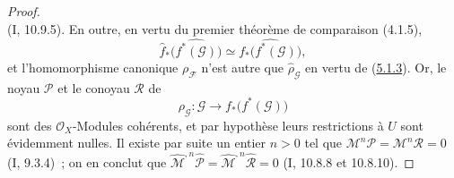 \begin{proof}
\[\]
(I, 10.9.5). En outre, en vertu du premier théorème de comparaison (4.1.5),
\[
\widehat f_*\bigl(\widehat{f^*(\mathcal G)}\bigr)
\simeq\widehat{f_*\bigl(f^*(\mathcal G)\bigr)},
\]
et l'homomorphisme canonique $\rho_{\mathcal F}$ n'est autre que
$\widehat{\rho}_{\mathcal G}$ en vertu de
(\hyperref[III.5.1.3-fr]{5.1.3}). Or, le noyau $\mathcal P$ et le conoyau
$\mathcal R$ de
\[
\rho_{\mathcal G}:\mathcal G\longrightarrow f_*\bigl(f^*(\mathcal G)\bigr)
\]
sont des $\mathcal O_X$-Modules cohérents, et par hypothèse leurs restrictions à
$U$ sont évidemment nulles. Il existe par suite un entier $n>0$ tel que
$\mathcal M^n\mathcal P=\mathcal M^n\mathcal R=0$ (I, 9.3.4)~; on en conclut que
$\widehat{\mathcal M}^{,n}\widehat{\mathcal P}=
\widehat{\mathcal M}^{,n}\widehat{\mathcal R}=0$
(I, 10.8.8 et 10.8.10).
\end{proof}

